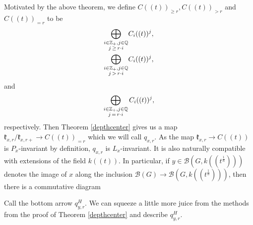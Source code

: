 \documentclass[12pt]{article}
\theoremstyle{remark}
\begin{document}
Motivated by the above theorem, we define $C((t))_{\geq r}, C((t))_{>r}$ and $C((t))_{=r}$ to be 
\begin{align*}
\displaystyle\bigoplus_{\substack{i\in\mathbb{Z}_+,j\in\mathbb{Q}\\ j\thinspace\geq\thinspace r\cdot i}}&C_i((t))^j,\\
\displaystyle\bigoplus_{\substack{i\in\mathbb{Z}_+,j\in\mathbb{Q}\\ j\thinspace>\thinspace r\cdot i}}&C_i((t))^j,
\end{align*}
and
\[
\displaystyle\bigoplus_{\substack{i\in\mathbb{Z}_+,j\in\mathbb{Q}\\ j\thinspace=\thinspace r\cdot i}}C_i((t))^j,
\]
respectively. Then Theorem \ref{depthcenter} gives us a map $\mathfrak{k}_{x,r}/\mathfrak{k}_{x,r+}\rightarrow C((t))_{=r}$ which we will call $q_{x,r}$. As the map $\mathfrak{k}_{x,r}\rightarrow C((t))$ is $P_x$-invariant by definition, $q_{x,r}$ is $L_x$-invariant. It is also naturally compatible with extensions of the field $k((t))$. In particular, if $y\in\mathcal{B}(G,k((t^{\frac{1}{n}})))$ denotes the image of $x$ along the inclusion $\mathcal{B}(G)\rightarrow\mathcal{B}(G,k((t^{\frac{1}{n}})))$, then there is a commutative diagram
\begin{center}
\end{center}

Call the bottom arrow $q_{y,r}^H.$ We can squeeze a little more juice from the methods from the proof of Theorem \ref{depthcenter} and describe $q_{y,r}^H$.
\end{document}
